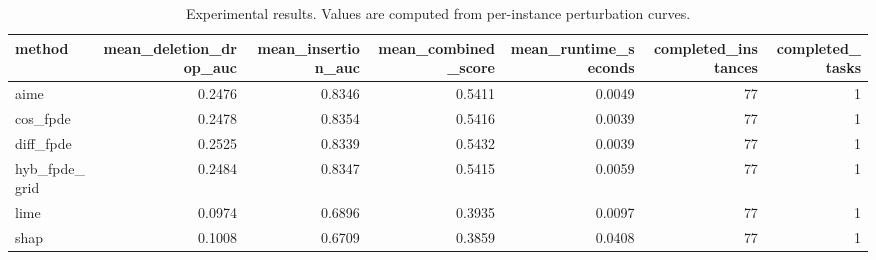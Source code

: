 \begin{table}[t]
\caption{Experimental results. Values are computed from per-instance perturbation curves.}
\label{tab:main_results_computed}
\centering
\begin{tabular}{lrrrrrr}
\toprule
method & mean\_deletion\_drop\_auc & mean\_insertion\_auc & mean\_combined\_score & mean\_runtime\_seconds & completed\_instances & completed\_tasks \\
\midrule
aime & 0.2476 & 0.8346 & 0.5411 & 0.0049 & 77 & 1 \\
cos\_fpde & 0.2478 & 0.8354 & 0.5416 & 0.0039 & 77 & 1 \\
diff\_fpde & 0.2525 & 0.8339 & 0.5432 & 0.0039 & 77 & 1 \\
hyb\_fpde\_grid & 0.2484 & 0.8347 & 0.5415 & 0.0059 & 77 & 1 \\
lime & 0.0974 & 0.6896 & 0.3935 & 0.0097 & 77 & 1 \\
shap & 0.1008 & 0.6709 & 0.3859 & 0.0408 & 77 & 1 \\
\bottomrule
\end{tabular}

\end{table}
